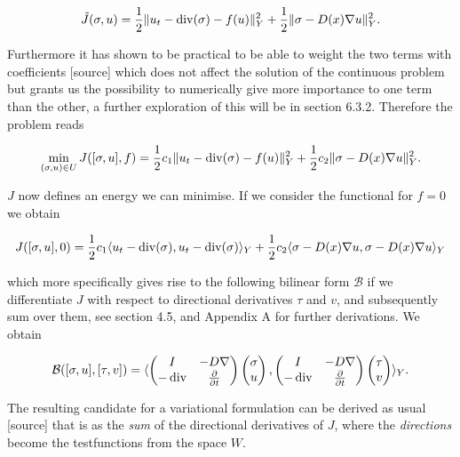 \documentclass[../draft_1.tex]{subfiles}
\begin{document}
\begin{ceqn}
\begin{align}
\tilde{J}(\sigma, u) =\frac{1}{2}\| u_t - \mathop{}\!\mathrm{div}(\sigma) - f(u) \|_Y^2 + \frac{1}{2}\| \sigma - D(x) \nabla u \| _Y^2.
\end{align}
\end{ceqn}
Furthermore it has shown to be practical to be able to weight the two terms with coefficients [source] which does not affect the solution of the continuous problem but grants us the possibility to numerically give more importance to one term than the other, a further exploration of this will be in section 6.3.2. Therefore the problem reads
\begin{ceqn}
	\begin{align}
	\label{functional}
  \min_{(\sigma, u) \in U} J([\sigma, u], f) = \frac{1}{2} c_1 \| u_t - \mathop{}\!\mathrm{div}(\sigma) - f(u) \|_Y^2 + \frac{1}{2} c_2 \| \sigma - D(x) \nabla u \|_Y^2.
	\end{align}
\end{ceqn}
$J$ now defines an energy we can minimise. If we consider the functional for $ f = 0$ we obtain
\begin{ceqn}
	\begin{align}
J([\sigma, u], 0) = \frac{1}{2} c_1 \langle u_t - \mathop{}\!\mathrm{div}(\sigma), u_t - \mathop{}\!\mathrm{div}(\sigma)\rangle_Y + \frac{1}{2} c_2 \langle \sigma - D(x) \nabla u, \sigma - D(x) \nabla u \rangle_Y
	\end{align}
\end{ceqn}
which more specifically gives rise to the following bilinear form $\mathcal{B}$ if we differentiate $J$ with respect to directional derivatives $\tau$ and $v$, and subsequently sum over them, see section 4.5, and Appendix A for further derivations. We obtain
\begin{ceqn}
	\begin{equation}
	\begin{aligned}
	\mathcal{B} ([\sigma, u], [\tau, v]) = \langle \begin{pmatrix} 
	I & - D \nabla \\
	-\mathop{}\!\mathrm{div} & \frac{\partial}{\partial t}
	\end{pmatrix} 
	\begin{pmatrix}
	\sigma \\
	u
	\end{pmatrix}, 
	\begin{pmatrix}
	I & - D \nabla \\
	-\mathop{}\!\mathrm{div} & \frac{\partial}{\partial t}
	\end{pmatrix}
	\begin{pmatrix}
	\tau \\
	v
	\end{pmatrix} \rangle_Y.
	\end{aligned}
	\end{equation}
\end{ceqn}
The resulting candidate for a variational formulation can be derived as usual [source] that is as the \textit{sum} of the directional derivatives of $J$, where the \textit{directions} become the testfunctions from the space $W$.
\end{document}
